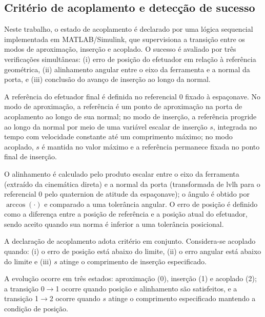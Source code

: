 \subsection{Critério de acoplamento e detecção de sucesso}
\label{subsec:criterio_acoplamento_sucesso}

Neste trabalho, o estado de acoplamento é declarado por uma lógica sequencial implementada em MATLAB/Simulink, que supervisiona a transição entre os modos de aproximação, inserção e acoplado.
O sucesso é avaliado por três verificações simultâneas:
(i) erro de posição do efetuador em relação à referência geométrica,
(ii) alinhamento angular entre o eixo da ferramenta e a normal da porta, e
(iii) conclusão do avanço de inserção ao longo da normal.

A referência do efetuador final é definida no referencial 0 fixado à espaçonave.
No modo de aproximação, a referência é um ponto de aproximação na porta de acoplamento ao longo de sua normal;
no modo de inserção, a referência progride ao longo da normal por meio de uma variável escalar de inserção $s$, integrada no tempo com velocidade constante até um comprimento máximo; no modo acoplado, $s$ é mantida no valor máximo e a referência permanece fixada no ponto final de inserção.

O alinhamento é calculado pelo produto escalar entre o eixo da ferramenta (extraído da cinemática direta) e a normal da porta (transformada de \gls{lvlh} para o referencial 0 pelo quaternion de atitude da espaçonave); o ângulo é obtido por $\arccos(\cdot)$ e comparado a uma tolerância angular.
O erro de posição é definido como a diferença entre a posição de referência e a posição atual do efetuador, sendo aceito quando sua norma é inferior a uma tolerância posicional.

A declaração de acoplamento adota critério em conjunto.
Considera-se acoplado quando:
(i) o erro de posição está abaixo do limite,
(ii) o erro angular está abaixo do limite e
(iii) $s$ atinge o comprimento de inserção especificado.

A evolução ocorre em três estados: aproximação (0), inserção (1) e acoplado (2);
a transição 0$\rightarrow$1 ocorre quando posição e alinhamento são satisfeitos, e a transição 1$\rightarrow$2 ocorre quando $s$ atinge o comprimento especificado mantendo a condição de posição.